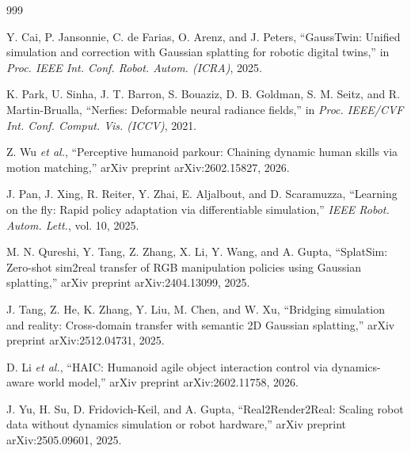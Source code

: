 \documentclass[12pt,a4paper,oneside]{report}
\begin{document}
\begin{thebibliography}{999}

Y. Cai, P. Jansonnie, C. de Farias, O. Arenz, and J. Peters, ``{GaussTwin}: Unified simulation and correction with Gaussian splatting for robotic digital twins,'' in \textit{Proc. IEEE Int. Conf. Robot. Autom. (ICRA)}, 2025.




K. Park, U. Sinha, J. T. Barron, S. Bouaziz, D. B. Goldman, S. M. Seitz, and R. Martin-Brualla, ``Nerfies: Deformable neural radiance fields,'' in \textit{Proc. IEEE/CVF Int. Conf. Comput. Vis. (ICCV)}, 2021.




Z. Wu \textit{et al.}, ``Perceptive humanoid parkour: Chaining dynamic human skills via motion matching,'' arXiv preprint arXiv:2602.15827, 2026.




J. Pan, J. Xing, R. Reiter, Y. Zhai, E. Aljalbout, and D. Scaramuzza, ``Learning on the fly: Rapid policy adaptation via differentiable simulation,'' \textit{IEEE Robot. Autom. Lett.}, vol. 10, 2025.




M. N. Qureshi, Y. Tang, Z. Zhang, X. Li, Y. Wang, and A. Gupta, ``{SplatSim}: Zero-shot sim2real transfer of {RGB} manipulation policies using Gaussian splatting,'' arXiv preprint arXiv:2404.13099, 2025.




J. Tang, Z. He, K. Zhang, Y. Liu, M. Chen, and W. Xu, ``Bridging simulation and reality: Cross-domain transfer with semantic 2D Gaussian splatting,'' arXiv preprint arXiv:2512.04731, 2025.




D. Li \textit{et al.}, ``{HAIC}: Humanoid agile object interaction control via dynamics-aware world model,'' arXiv preprint arXiv:2602.11758, 2026.




J. Yu, H. Su, D. Fridovich-Keil, and A. Gupta, ``{Real2Render2Real}: Scaling robot data without dynamics simulation or robot hardware,'' arXiv preprint arXiv:2505.09601, 2025.




\end{thebibliography}
\end{document}
